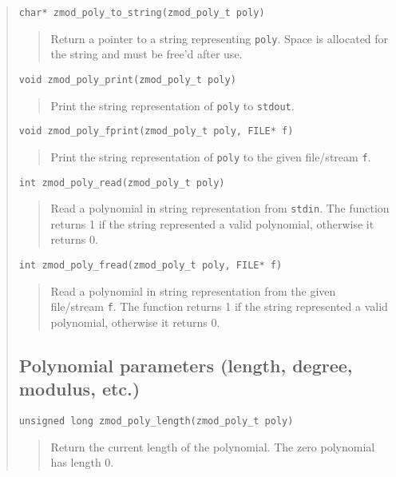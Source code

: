 \documentclass[a4paper,10pt]{article}
\newcommand{\code}{\lstinline}
\begin{document}
\begin{quote}
\begin{lstlisting}
char* zmod_poly_to_string(zmod_poly_t poly)
\end{lstlisting}
\begin{quote}
Return a pointer to a string representing \code{poly}. Space is allocated for the string and must be free'd after use.
\end{quote}

\begin{lstlisting}
void zmod_poly_print(zmod_poly_t poly)
\end{lstlisting}
\begin{quote}
Print the string representation of \code{poly} to \code{stdout}.
\end{quote}

\begin{lstlisting}
void zmod_poly_fprint(zmod_poly_t poly, FILE* f)
\end{lstlisting}
\begin{quote}
Print the string representation of \code{poly} to the given file/stream \code{f}.
\end{quote}

\begin{lstlisting}
int zmod_poly_read(zmod_poly_t poly)
\end{lstlisting}
\begin{quote}
Read a polynomial in string representation from \code{stdin}. The function returns 1 if the string represented a valid polynomial, otherwise it returns 0.
\end{quote}

\begin{lstlisting}
int zmod_poly_fread(zmod_poly_t poly, FILE* f)
\end{lstlisting}
\begin{quote}
Read a polynomial in string representation from the given file/stream \code{f}. The function returns 1 if the string represented a valid polynomial, otherwise it returns 0.
\end{quote}

\subsection{Polynomial parameters (length, degree, modulus, etc.)}
\begin{lstlisting}
unsigned long zmod_poly_length(zmod_poly_t poly)
\end{lstlisting}
\begin{quote}
Return the current length of the polynomial. The zero polynomial has length 0.
\end{quote}


\end{quote}
\end{document}
